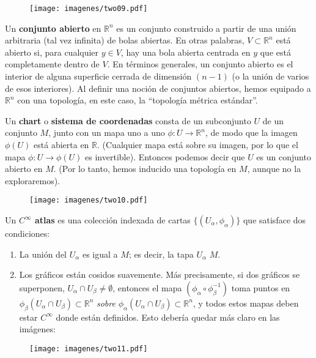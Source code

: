 \documentclass[11pt,b5paper,openany,twoside]{book}
\begin{document}
\begin{figure}[h]
\centering
\texttt{[image: imagenes/two09.pdf]}
\end{figure}

\noindent
Un {\bf conjunto abierto} en $\mathbb{R}^n$ es un conjunto construido a partir de una unión arbitraria (tal vez infinita) de bolas abiertas.
En otras palabras, $V\subset \mathbb{R}^n$ está abierto si, para cualquier $y\in V$, hay una bola abierta centrada en $y$ que está completamente dentro de $V$.
En términos generales, un conjunto abierto es el interior de alguna superficie cerrada de dimensión $(n-1)$ (o la unión de varios de esos interiores).
Al definir una noción de conjuntos abiertos, hemos equipado a $\mathbb{R}^n$ con una topología, en este caso, la ``topología métrica estándar''.

Un {\bf chart} o {\bf sistema de coordenadas} consta de un subconjunto $U$ de un conjunto $M$, junto con un mapa uno a uno $\phi:U\rightarrow\mathbb{R}^n$, de modo que la imagen $\phi(U)$ está abierta en $\mathbb{R}$.
(Cualquier mapa está sobre su imagen, por lo que el mapa $\phi:U\rightarrow \phi(U)$ es invertible).
Entonces podemos decir que $U$ es un conjunto abierto en $M$.
(Por lo tanto, hemos inducido una topología en $M$, aunque no la exploraremos).

\begin{figure}[h]
\centering
\texttt{[image: imagenes/two10.pdf]}
\end{figure}

\noindent
Un {\bf $C^\infty$ atlas} es una colección indexada de cartas $\{(U_\alpha,\phi_\alpha)\}$ que satisface dos condiciones:

\begin{enumerate}
\item La unión del $U_\alpha$ es igual a $M$; es decir, la tapa $U_\alpha$ $M$.
\item Los gráficos están cosidos suavemente.
Más precisamente, si dos gráficos se superponen, $U_\alpha\cap U_\beta\neq\emptyset$, entonces el mapa $(\phi_\alpha\circ\phi_\beta^{-1})$ toma puntos en $\phi_\beta(U_\alpha\cap U_\beta)\subset\mathbb{R}^n$ {\it sobre} $\phi_\alpha(U_\alpha\cap U_\beta)\subset\mathbb{R}^n$, y todos estos mapas deben estar $C^\infty$ donde están definidos.
Esto debería quedar más claro en las imágenes:

\end{enumerate}

\begin{figure}[h]
\centering
\texttt{[image: imagenes/two11.pdf]}
\end{figure}
\end{document}
